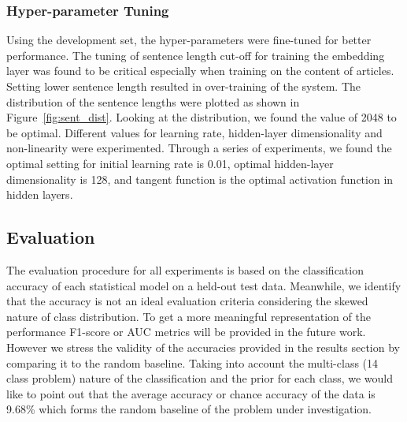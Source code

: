 \documentclass[12pt]{article}
\begin{document}
\subsubsection{Hyper-parameter Tuning}
Using the development set, the hyper-parameters were fine-tuned for better performance. The tuning of sentence length cut-off for training the embedding layer was found to be critical especially when training on the content of articles. Setting lower sentence length resulted in over-training of the system. The distribution of the sentence lengths were plotted as shown in Figure~\ref{fig:sent_dist}. Looking at the distribution, we found the value of 2048 to be optimal. Different values for learning rate, hidden-layer dimensionality and non-linearity were experimented. Through a series of experiments, we found the optimal setting for initial learning rate is 0.01, optimal hidden-layer dimensionality is 128, and tangent function is the optimal activation function in hidden layers.





\subsection{Evaluation}
The evaluation procedure for all experiments is based on the classification accuracy of each statistical model on a held-out test data. Meanwhile, we identify that the accuracy is not an ideal evaluation criteria considering the skewed nature of class distribution. To get a more meaningful representation of the performance F1-score or AUC metrics will be provided in the future work. However we stress the validity of the accuracies provided in the results section by comparing it to the random baseline. Taking into account the multi-class (14 class problem) nature of the classification and the prior for each class, we would like to point out that the average accuracy or chance accuracy of the data is 9.68\% which forms the random baseline of the problem under investigation.
\end{document}

